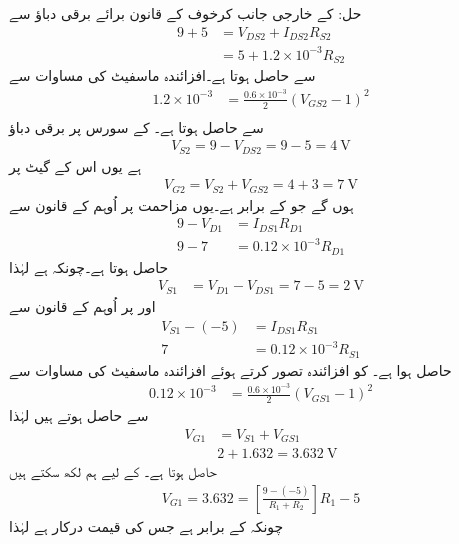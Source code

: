 حل: کے خارجی جانب کرخوف کے قانون برائے برقی دباؤ سے
\begin{align*}
9+5 &=V_{DS2}+I_{DS2}R_{S2}\\
&=5+1.2 \times 10^{-3} R_{S2}
\end{align*}
سے  حاصل ہوتا ہے۔افزائندہ ماسفیٹ کی مساوات سے 
\begin{align*}
1.2 \times 10^{-3}&=\frac{0.6 \times 10^{-3}}{2} \left (V_{GS2}-1 \right)^2\\
\end{align*}
سے  حاصل ہوتا ہے۔ کے سورس پر برقی دباؤ
\begin{align*}
V_{S2}=9-V_{DS2}=9-5=\SI{4}{\volt}
\end{align*}
ہے یوں اس کے گیٹ پر 
\begin{align*}
V_{G2}=V_{S2}+V_{GS2}=4+3=\SI{7}{\volt}
\end{align*}
ہوں گے جو  کے برابر ہے۔یوں مزاحمت  پر اُوہم کے قانون سے
\begin{align*}
9-V_{D1}&=I_{DS1} R_{D1}\\
9-7&=0.12 \times 10^{-3} R_{D1}
\end{align*}
 حاصل ہوتا ہے۔چونکہ  ہے لہٰذا
\begin{align*}
V_{S1}&=V_{D1}-V_{DS1}=7-5=\SI{2}{\volt}
\end{align*}
اور  پر اُوہم کے قانون سے
\begin{align*}
V_{S1}-(-5)&=I_{DS1} R_{S1}\\
7&=0.12 \times 10^{-3} R_{S1}
\end{align*}
 حاصل ہوا ہے۔ کو افزائندہ تصور کرتے ہوئے افزائندہ ماسفیٹ کی مساوات سے
\begin{align*}
0.12 \times 10^{-3}&=\frac{0.6 \times 10^{-3}}{2} \left (V_{GS1}-1 \right)^2
\end{align*}
سے  حاصل ہوتے ہیں لہٰذا
\begin{align*}
V_{G1}&=V_{S1}+V_{GS1}\\
&2+1.632=\SI{3.632}{\volt}
\end{align*}
حاصل ہوتا ہے۔ کے لیے ہم لکھ سکتے ہیں
\begin{align*}
V_{G1}=3.632=\left[\frac{9-(-5)}{R_1+R_2}\right] R_1 -5
\end{align*}
چونکہ  کے برابر ہے جس کی قیمت  درکار ہے لہٰذا

